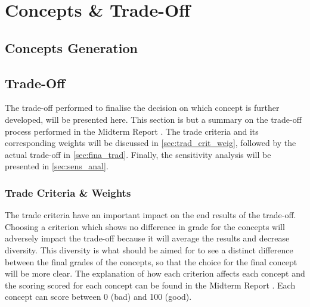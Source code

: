 \chapter{Concepts \& Trade-Off}
\setlength{\parindent}{15pt}
\label{ch:conc_trad}

\section{Concepts Generation}
\label{sec:conc_gene}

\section{Trade-Off}
\label{sec:trad}

The trade-off performed to finalise the decision on which concept is further developed, will be presented here. This section is but a summary on the trade-off process performed in the Midterm Report \cite{midterm}. The trade criteria and its corresponding weights will be discussed in \autoref{sec:trad_crit_weig}, followed by the actual trade-off in \autoref{sec:fina_trad}. Finally, the sensitivity analysis will be presented in \autoref{sec:sens_anal}.

\subsection{Trade Criteria \& Weights}
\label{sec:trad_crit_weig}

The trade criteria have an important impact on the end results of the trade-off. Choosing a criterion which shows no difference in grade for the concepts will adversely impact the trade-off because it will average the results and decrease diversity. This diversity is what should be aimed for to see a distinct difference between the final grades of the concepts, so that the choice for the final concept will be more clear. The explanation of how each criterion affects each concept and the scoring scored for each concept can be found in the Midterm Report \cite{midterm}. Each concept can score between 0 (bad) and 100 (good).

